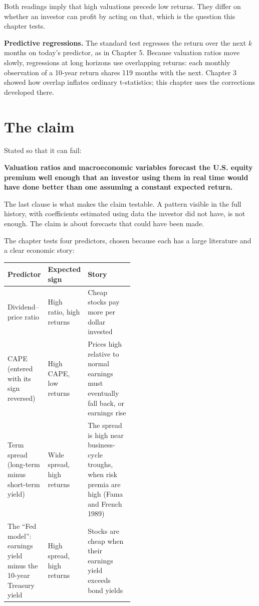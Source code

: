 Both readings imply that high valuations precede low returns. They differ on whether an investor can profit by acting on that, which is the question this chapter tests.

\textbf{Predictive regressions.} The standard test regresses the return over the next $k$ months on today's predictor, as in Chapter 5. Because valuation ratios move slowly, regressions at long horizons use overlapping returns: each monthly observation of a 10-year return shares 119 months with the next. Chapter 3 showed how overlap inflates ordinary t-statistics; this chapter uses the corrections developed there.

\section{The claim}
\label{sec:07-claim}

Stated so that it can fail:

\begin{callout}
\textbf{Valuation ratios and macroeconomic variables forecast the U.S. equity premium well enough that an investor using them in real time would have done better than one assuming a constant expected return.}
\end{callout}

The last clause is what makes the claim testable. A pattern visible in the full history, with coefficients estimated using data the investor did not have, is not enough. The claim is about forecasts that could have been made.

The chapter tests four predictors, chosen because each has a large literature and a clear economic story:

\begin{center}
\small
\begin{tabularx}{0.9\linewidth}{@{}>{\raggedright\arraybackslash}p{0.30\linewidth}>{\raggedright\arraybackslash}p{0.20\linewidth}>{\raggedright\arraybackslash}X@{}}
\toprule
Predictor & Expected sign & Story \\
\midrule
Dividend--price ratio & High ratio, high returns & Cheap stocks pay more per dollar invested \\
CAPE (entered with its sign reversed) & High CAPE, low returns & Prices high relative to normal earnings must eventually fall back, or earnings rise \\
Term spread (long-term minus short-term yield) & Wide spread, high returns & The spread is high near business-cycle troughs, when risk premia are high (Fama and French 1989) \\
The ``Fed model'': earnings yield minus the 10-year Treasury yield & High spread, high returns & Stocks are cheap when their earnings yield exceeds bond yields \\
\bottomrule
\end{tabularx}
\end{center}

